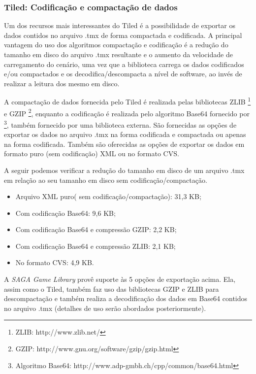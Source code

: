 \subsubsection{Tiled: Codificação e compactação de dados}
%
%
Um dos recursos mais interessantes do Tiled é a possibilidade de exportar os dados contidos no arquivo .tmx de forma compactada e codificada. A principal vantagem do uso dos algoritmos compactação e codificação é a redução do tamanho em disco do arquivo .tmx resultante e o aumento da velocidade de carregamento do cenário, uma vez que a biblioteca carrega os dados codificados e/ou compactados e os decodifica/descompacta a nível de software, ao invés de realizar a leitura dos mesmo em disco. 
\par 
A compactação de dados fornecida pelo Tiled é realizada pelas bibliotecas ZLIB \footnote{ZLIB: http://www.zlib.net/} e GZIP \footnote{GZIP: http://www.gnu.org/software/gzip/gzip.html}, enquanto a codificação é realizada pelo algoritmo Base64 fornecido por \footnote{Algoritmo Base64: http://www.adp-gmbh.ch/cpp/common/base64.html}, também fornecido por uma biblioteca externa. São fornecidas as opções de exportar os dados no arquivo .tmx na forma codificada e compactada ou apenas na forma codificada. Também são oferecidas as opções de exportar os dados em formato puro (sem codificação) XML ou no formato CVS. 
\par 
A seguir podemos verificar a redução do tamanho em disco de um arquivo .tmx em relação ao seu tamanho em disco sem codificação/compactação.
%
\begin{itemize}
 \item Arquivo XML puro( sem codificação/compactação): 31,3 KB;
 \item Com codificação Base64: 9,6 KB;
 \item Com codificação Base64 e compressão GZIP: 2,2 KB;
 \item Com codificação Base64 e compressão ZLIB: 2,1 KB;
 \item No formato CVS: 4,9 KB.
\end{itemize}
%
A \textit{SAGA Game Library} provê suporte às 5 opções de exportação acima. Ela, assim como o Tiled, também faz uso das bibliotecas GZIP e ZLIB para descompactação e também realiza a decodificação dos dados em Base64 contidos no arquivo .tmx (detalhes de uso serão abordados posteriormente).
%
%
%
%
